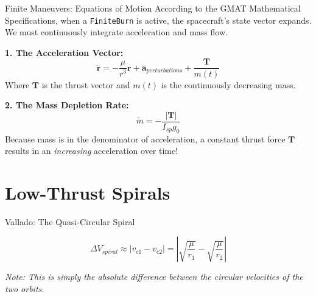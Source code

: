 \documentclass[11pt]{beamer}
\begin{document}
\begin{frame}{Finite Maneuvers: Equations of Motion}
    According to the GMAT Mathematical Specifications, when a \texttt{FiniteBurn} is active, the spacecraft's state vector expands. We must continuously integrate acceleration and mass flow.
    
    \vspace{0.3cm}
    \textbf{1. The Acceleration Vector:}
    \begin{equation}
        \ddot{\boldsymbol{r}} = -\frac{\mu}{r^3}\boldsymbol{r} + \boldsymbol{a}_{perturbations} + \frac{\boldsymbol{T}}{m(t)}
    \end{equation}
    Where $\boldsymbol{T}$ is the thrust vector and $m(t)$ is the continuously decreasing mass.
    
    \vspace{0.3cm}
    \textbf{2. The Mass Depletion Rate:}
    \begin{equation}
        \dot{m} = -\frac{|\boldsymbol{T}|}{I_{sp} g_0}
    \end{equation}
    Because mass is in the denominator of acceleration, a constant thrust force $\boldsymbol{T}$ results in an \textit{increasing} acceleration over time!
\end{frame}

\section{Low-Thrust Spirals}

\begin{frame}{Vallado: The Quasi-Circular Spiral}
       
    
    \begin{equation}
        \Delta V_{spiral} \approx |v_{c1} - v_{c2}| = \left| \sqrt{\frac{\mu}{r_1}} - \sqrt{\frac{\mu}{r_2}} \right|
    \end{equation}
    
    \vspace{0.2cm}
    \textit{Note: This is simply the absolute difference between the circular velocities of the two orbits.}
\end{frame}
\end{document}
